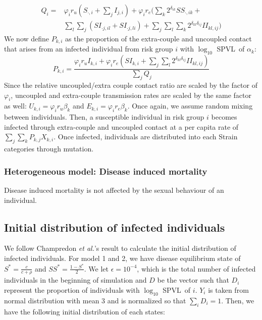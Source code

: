 \documentclass[10pt,letterpaper]{article}
\newcommand{\Lspvl}{$\log_{10}$ SPVL}
\newcommand{\etal}{\textit{et al.}}
\begin{document}
\begin{equation}
\begin{aligned}
Q_i = &\varphi_i r_u (S_{\cdot,i} +  \sum_j I_{j,i}) + \varphi_i r_e \bigg( \sum_k 2^{\delta_{ik}} SS_{\cdot, ik} +\\
&\sum_l \sum_j (SI_{\cdot j,il} + SI_{\cdot j, li}) + \sum_j \sum_l \sum_k 2^{\delta_{kl} \delta_{ij}} II_{kl,ij} \bigg)
\end{aligned}
\end{equation}
We now define $P_{k,i}$ as the proportion of the extra-couple and uncoupled contact that arises from an infected individual from risk group $i$ with \Lspvl\ of $\alpha_k$:
\begin{equation}
P_{k,i} = \frac{\varphi_i r_u I_{k,i} + \varphi_i r_e (SI_{k,i} + \sum_j \sum_l 2^{\delta_{kl} \delta_{ij} } II_{kl,ij} )}{\sum_j Q_j}
\end{equation}
Since the relative uncoupled/extra couple contact ratio are scaled by the factor of $\varphi_i$, uncoupled and extra-couple transmission rates are scaled by the same factor as well: $U_{k,i} = \varphi_i r_u \beta_k$ and $E_{k,i} = \varphi_i r_e \beta_k$. Once again, we assume random mixing between individuals. Then, a susceptible individual in risk group $i$ becomes infected through extra-couple and uncoupled contact at a per capita rate of $\sum_j \sum_k P_{k,j} X_{k,i}$. Once infected, individuals are distributed into each Strain categories through mutation.

\subsubsection*{Heterogeneous model: Disease induced mortality}

Disease induced mortality is not affected by the sexual behaviour of an individual. 

\subsection*{Initial distribution of infected individuals}

We follow Champredon \etal's result to calculate the initial distribution of infected individuals. For model 1 and 2, we have disease equilibrium state of $S^* = \frac{c}{c + \rho}$ and $SS^* = \frac{1-S^*}{2}$. We let $\epsilon = 10^{-4}$, which is the total number of infected individuals in the beginning of simulation and $D$ be the vector such that $D_i$ represent the proportion of individuals with \Lspvl\ of $i$. $Y_i$ is taken from normal distribution with mean 3 and is normalized so that $\sum_i D_i = 1$. Then, we have the following initial distribution of each states:
\end{document}
